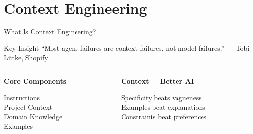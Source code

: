 \documentclass[aspectratio=169]{beamer}
\begin{document}
\section{Context Engineering}

\begin{frame}{What Is Context Engineering?}
  \begin{block}{Key Insight\supercite{lutke2024context}}
    ``Most agent failures are context failures, not model failures.'' --- Tobi Lütke, Shopify
  \end{block}

  \vspace{0.5cm}

  \begin{columns}[T]
    \begin{column}{0.48\textwidth}
      \centering
      \large\bfseries
      \textcolor{conesaTeal}{Core Components}

      \vspace{0.5cm}
      \normalsize
      Instructions\\
      Project Context\\
      Domain Knowledge\\
      Examples
    \end{column}
    \begin{column}{0.48\textwidth}
      \centering
      \large\bfseries
      \textcolor{conesaOrange}{Context = Better AI}

      \vspace{0.5cm}
      \normalsize
      Specificity beats vagueness\\
      Examples beat explanations\\
      Constraints beat preferences
    \end{column}
  \end{columns}
\end{frame}
\end{document}
